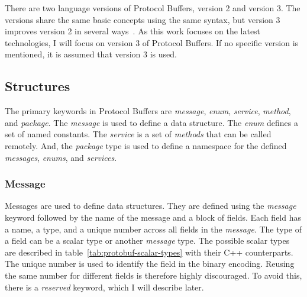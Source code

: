 There are two language versions of Protocol Buffers, version 2 and version 3.
The versions share the same basic concepts using the same syntax, but version 3 improves version 2 in several ways~\cite{protobuf-proto3}.
As this work focuses on the latest technologies, I will focus on version 3 of Protocol Buffers.
If no specific version is mentioned, it is assumed that version 3 is used.

\subsection{Structures}
The primary keywords in Protocol Buffers are \textit{message}, \textit{enum}, \textit{service}, \textit{method}, and \textit{package}.
The \textit{message} is used to define a data structure.
The \textit{enum} defines a set of named constants.
The \textit{service} is a set of \textit{methods} that can be called remotely.
And, the \textit{package} type is used to define a namespace for the defined \textit{messages}, \textit{enums}, and \textit{services}.
\cite{protobuf-proto3}

\subsubsection{Message}
Messages are used to define data structures.
They are defined using the \textit{message} keyword followed by the name of the message and a block of fields.
Each field has a name, a type, and a unique number across all fields in the \textit{message}.
The type of a field can be a scalar type or another \textit{message} type.
The possible scalar types are described in table~\ref{tab:protobuf-scalar-types} with their C++ counterparts.
The unique number is used to identify the field in the binary encoding.
Reusing the same number for different fields is therefore highly discouraged.
To avoid this, there is a \textit{reserved} keyword, which I will describe later.
\cite{protobuf-proto3}

